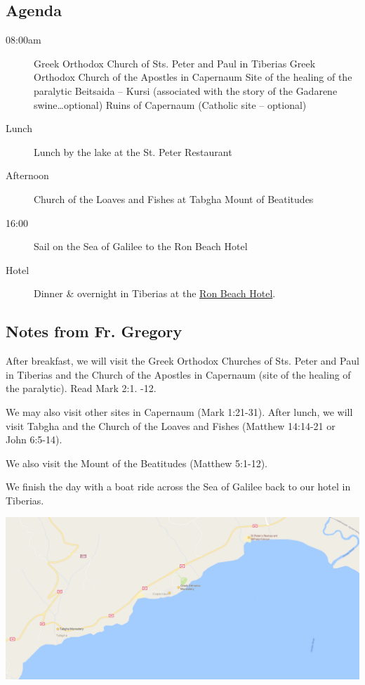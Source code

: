 \documentclass[letterpaper]{report}
\begin{document}
\subsection{Agenda}
\begin{description}
	\item[08:00am]  Greek Orthodox Church of Sts. Peter and Paul in Tiberias 
	  \subitem Greek Orthodox Church of the Apostles in Capernaum
	  \subitem Site of the healing of the paralytic
	  \subitem Beitsaida – Kursi
	      (associated with the story of the Gadarene swine…optional)
	  \subitem Ruins of Capernaum (Catholic site – optional) 
	\item[Lunch] Lunch by the lake at the St. Peter Restaurant
	\item[Afternoon] Church of the Loaves and Fishes at Tabgha Mount of 
	     Beatitudes
	\item[16:00] Sail on the Sea of Galilee to the Ron Beach Hotel
	\item[Hotel] Dinner \& overnight in Tiberias at the
	  \href{http://www.ronbeachhotel.com/}{Ron Beach Hotel}.
\end{description}

\subsection{Notes from Fr. Gregory}
After breakfast, we will visit the Greek Orthodox Churches of
Sts. Peter and Paul in Tiberias and the Church of the Apostles in Capernaum
(site of the healing of the paralytic).
Read Mark 2:1. -12.

We may also visit other sites in Capernaum (Mark 1:21-31).
After lunch, we will visit Tabgha and the Church of the Loaves and Fishes
(Matthew 14:14-21 or John 6:5-14).

We also visit the Mount of the Beatitudes (Matthew 5:1-12).

We finish the day with a boat ride across the Sea of Galilee back to our hotel 
in Tiberias.

\includegraphics[width=\textwidth]{Capernaum}
\end{document}

